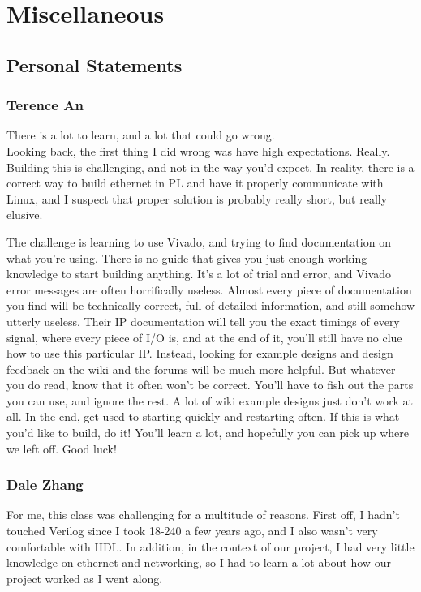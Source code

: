 \documentclass[12pt]{report}
\begin{document}
\chapter{Miscellaneous}
\section{Personal Statements}
\subsection{Terence An}
There is a lot to learn, and a lot that could go wrong. \\
Looking back, the first thing I did wrong was have high expectations. Really. \\
Building this is challenging, and not in the way you'd expect. In reality, there is a correct way to build ethernet in PL and have it properly communicate with Linux, and I suspect that proper solution is probably really short, but really elusive.

The challenge is learning to use Vivado, and trying to find documentation on what you're using. There is no guide that gives you just enough working knowledge to start building anything. It's a lot of trial and error, and Vivado error messages are often horrifically useless.
Almost every piece of documentation you find will be technically correct, full of detailed information, and still somehow utterly useless.
Their IP documentation will tell you the exact timings of every signal, where every piece of I/O is, and at the end of it, you'll still have no clue how to use this particular IP. Instead, looking for example designs and design feedback on the wiki and the forums will be much more helpful. But whatever you do read, know that it often won't be correct. You'll have to fish out the parts you can use, and ignore the rest. A lot of wiki example designs just don't work at all. In the end, get used to starting quickly and restarting often. If this is what you'd like to build, do it! You'll learn a lot, and hopefully you can pick up where we left off. Good luck!

\subsection{Dale Zhang}
For me, this class was challenging for a multitude of reasons. First off, I hadn't touched Verilog since I took 18-240 a few years ago, and I also wasn't very comfortable with HDL. In addition, in the context of our project, I had very little knowledge on ethernet and networking, so I had to learn a lot about how our project worked as I went along.
\end{document}
